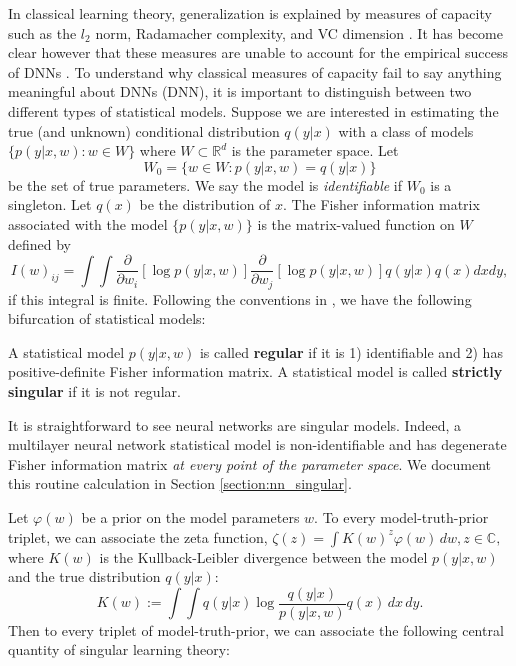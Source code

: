 \documentclass{article} %
\begin{document}
In classical learning theory, generalization is explained by measures of capacity such as the $l_2$ norm, Radamacher complexity, and VC dimension \citep{bousquet2003introduction}. It has become clear however that these measures are unable to account for the empirical success of DNNs \citep{zhang_understanding_2017}. 
To understand why classical measures of capacity fail to say anything meaningful about DNNs (DNN), it is important to distinguish between two different types of statistical models. Suppose we are interested in estimating the true (and unknown) conditional distribution $q(y|x)$ with a class of models $\{p(y|x,w): w \in W\}$ where $W \subset \mathbb R^d$ is the parameter space. Let 
$$
W_0 = \{w \in W: p(y|x,w)=q(y|x)\}
$$
 be the set of true parameters. We say the model is \textit{identifiable} if $W_0$ is a singleton. Let $q(x)$ be the distribution of $x$. The Fisher information matrix associated with the model $\{p(y|x,w)\}$ is the matrix-valued function on $W$ defined by
 \begin{equation*}
 I(w)_{ij} = \int\!\int \frac{\partial}{\partial w_i}[ \log p(y|x,w) ] \frac{\partial}{\partial w_j}[ \log p(y|x,w) ] q(y|x) q(x) dx dy,
 \label{eq:FIM}
 \end{equation*}
if this integral is finite. 
Following the conventions in \cite{watanabe_algebraic_2009}, we have the following bifurcation of statistical models:
\begin{definition}
A statistical model $p(y|x,w)$ is called \textbf{regular} if it is 1) identifiable and 2) has positive-definite Fisher information matrix. A statistical model is called \textbf{strictly singular} if it is not regular. 
\end{definition}
It is straightforward to see neural networks are singular models. Indeed, a multilayer neural network statistical model is non-identifiable and has degenerate Fisher information matrix \emph{at every point of the parameter space}. We document this routine calculation in Section \ref{section:nn_singular}. 


Let  $\varphi(w)$ be a prior on the model parameters $w$.
To every model-truth-prior triplet, we can associate the zeta function,
$
\zeta(z) = \int K(w)^z \varphi(w) \,dw, z \in \mathbb C,
$
where $K(w)$ is the Kullback-Leibler divergence between the model $p(y|x,w)$ and the true distribution $q(y|x)$:
$$
    K(w) := \int \!\int q(y|x) \log \frac{ q(y|x) }{ p(y|x,w) } q(x) \,dx \,dy.
$$
Then to every triplet of model-truth-prior, we can associate the following central quantity of singular learning theory:
\end{document}
